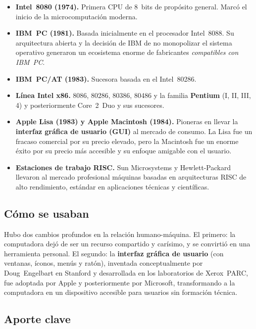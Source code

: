 \documentclass[10pt,letterpaper,twocolumn]{article}
\begin{document}
\begin{itemize}[leftmargin=*,itemsep=0.2em]
  \item \textbf{Intel~8080 (1974).} Primera CPU de 8~bits de propósito
    general. Marcó el inicio de la microcomputación moderna.
  \item \textbf{IBM~PC (1981).} Basada inicialmente en el procesador
    Intel~8088. Su arquitectura abierta y la decisión de IBM de no
    monopolizar el sistema operativo generaron un ecosistema enorme de
    fabricantes \emph{compatibles con IBM~PC}.
  \item \textbf{IBM~PC/AT (1983).} Sucesora basada en el Intel~80286.
  \item \textbf{Línea Intel x86.} 8086, 80286, 80386, 80486 y la
    familia \textbf{Pentium} (I, II, III, 4) y posteriormente Core~2~Duo
    y sus sucesores.
  \item \textbf{Apple Lisa (1983) y Apple Macintosh (1984).} Pioneras en
    llevar la \textbf{interfaz gráfica de usuario (GUI)} al mercado de
    consumo. La Lisa fue un fracaso comercial por su precio elevado,
    pero la Macintosh fue un enorme éxito por su precio más accesible y
    su enfoque amigable con el usuario.
  \item \textbf{Estaciones de trabajo RISC.} Sun Microsystems y
    Hewlett-Packard llevaron al mercado profesional máquinas basadas
    en arquitecturas RISC de alto rendimiento, estándar en aplicaciones
    técnicas y científicas.
\end{itemize}

\subsection{Cómo se usaban}

Hubo dos cambios profundos en la relación humano-máquina. El primero:
la computadora dejó de ser un recurso compartido y carísimo, y se
convirtió en una herramienta personal. El segundo: la \textbf{interfaz
gráfica de usuario} (con ventanas, íconos, menús y ratón), inventada
conceptualmente por Doug~Engelbart en Stanford y desarrollada en los
laboratorios de Xerox~PARC, fue adoptada por Apple y posteriormente por
Microsoft, transformando a la computadora en un dispositivo accesible
para usuarios sin formación técnica.

\subsection{Aporte clave}
\end{document}
